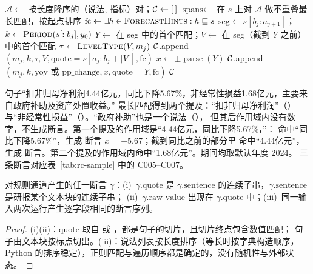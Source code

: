 \begin{algorithm}[t]
\caption{规则通道断言抽取（，简化）}
\label{alg:rc-rule}
\begin{algorithmic}[1]
  \State $\mathcal{A}\gets$ 按长度降序的（说法, 指标）对；$\mathcal{C}\gets[\,]$
    \State $\text{spans}\gets$ 在 $s$ 上对 $\mathcal{A}$ 做不重叠最长匹配，按起点排序
    \State $\text{fc}\gets \exists h\in\textsc{ForecastHints}: h\sqsubseteq s$
      \State $\text{seg}\gets s[b_j : a_{j+1}]$；$k\gets\textsc{Period}(s[:b_j], y_0)$
      \State $Y\gets$  在 seg 中的首个匹配；$V\gets$  在 seg（截到 $Y$ 之前）中的首个匹配
        \State $\tau\gets\textsc{LevelType}(V, m_j)$
        \If{$\tau\neq\bot$}\State $\mathcal{C}$.append$(m_j,k,\tau,V,\text{quote}=s[a_j:b_j+|V|],\text{fc})$\EndIf
      \EndIf
        \State $x\gets \pm\operatorname{parse}(Y)$
        \State $\mathcal{C}$.append$(m_j,k,\text{yoy 或 pp\_change},x,\text{quote}=Y,\text{fc})$
      \EndIf
    \EndFor
  \EndFor
  \State \Return $\mathcal{C}$
\EndFunction
\end{algorithmic}
\end{algorithm}

\begin{example}
句子“扣非归母净利润4.44亿元，同比下降5.67\%，非经常性损益1.68亿元，主要来自政府补助及资产处置收益。”
最长匹配得到两个提及：“扣非归母净利润”（）与“非经常性损益”（）。“政府补助”也是一个说法（），
但其后作用域内没有数字，不生成断言。第一个提及的作用域是“4.44亿元，同比下降5.67\%，”： 命中“同比下降5.67\%”，生成  断言
$x=-5.67$；截到同比之前的部分里  命中“4.44亿元”，生成  断言。第二个提及的作用域内命中“1.68亿元”。期间均取默认年度 2024。
三条断言对应表~\ref{tab:rc-sample} 中的 C005--C007。
\end{example}

\begin{proposition}[规则通道的结构性质]
\label{prop:rc-rule}
对规则通道产生的任一断言 $\gamma$：(i)~$\gamma.\text{quote}$ 是 $\gamma.\text{sentence}$ 的连续子串，$\gamma.\text{sentence}$ 是研报某个文本块的连续子串；
(ii)~$\gamma.\text{raw\_value}$ 出现在 $\gamma.\text{quote}$ 中；(iii)~同一输入两次运行产生逐字段相同的断言序列。
\end{proposition}
\begin{proof}
(i)(ii)：quote 取自  或 ，都是句子的切片，且切片终点包含数值匹配；
句子由文本块按标点切出。(iii)：说法列表按长度排序（等长时按字典构造顺序，Python 的排序稳定），正则匹配与遍历顺序都是确定的，没有随机性与外部状态。
\end{proof}

